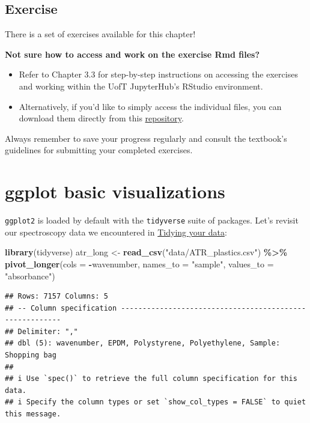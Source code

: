 \documentclass[
]{book}
\newenvironment{Shaded}{\begin{snugshade}}{\end{snugshade}}
\newcommand{\AttributeTok}[1]{\textcolor[rgb]{0.13,0.29,0.53}{#1}}
\newcommand{\FunctionTok}[1]{\textcolor[rgb]{0.13,0.29,0.53}{\textbf{#1}}}
\newcommand{\NormalTok}[1]{#1}
\newcommand{\OtherTok}[1]{\textcolor[rgb]{0.56,0.35,0.01}{#1}}
\newcommand{\SpecialCharTok}[1]{\textcolor[rgb]{0.81,0.36,0.00}{\textbf{#1}}}
\newcommand{\StringTok}[1]{\textcolor[rgb]{0.31,0.60,0.02}{#1}}
\begin{document}
\hypertarget{exercise-8}{%
\section{Exercise}\label{exercise-8}}

There is a set of exercises available for this chapter!

\textbf{Not sure how to access and work on the exercise Rmd files? }

\begin{itemize}
\item
  Refer to Chapter 3.3 for step-by-step instructions on accessing the exercises and working within the UofT JupyterHub's RStudio environment.
\item
  Alternatively, if you'd like to simply access the individual files, you can download them directly from this \href{https://github.com/UofTChem-Teaching/R4EnvChem-Exercises}{repository}.
\end{itemize}

Always remember to save your progress regularly and consult the textbook's guidelines for submitting your completed exercises.

\hypertarget{ggplot-basic-visualizations}{%
\chapter{ggplot basic visualizations}\label{ggplot-basic-visualizations}}

\texttt{ggplot2} is loaded by default with the \texttt{tidyverse} suite of packages. Let's revisit our spectroscopy data we encountered in \protect\hyperlink{tidying-your-data}{Tidying your data}:

\begin{Shaded}
\begin{Highlighting}[]
\FunctionTok{library}\NormalTok{(tidyverse)}
\NormalTok{atr\_long }\OtherTok{\textless{}{-}} \FunctionTok{read\_csv}\NormalTok{(}\StringTok{"data/ATR\_plastics.csv"}\NormalTok{) }\SpecialCharTok{\%\textgreater{}\%}
    \FunctionTok{pivot\_longer}\NormalTok{(}\AttributeTok{cols =} \SpecialCharTok{{-}}\NormalTok{wavenumber, }
               \AttributeTok{names\_to =} \StringTok{"sample"}\NormalTok{,}
               \AttributeTok{values\_to =} \StringTok{"absorbance"}\NormalTok{) }
\end{Highlighting}
\end{Shaded}

\begin{verbatim}
## Rows: 7157 Columns: 5
## -- Column specification --------------------------------------------------------
## Delimiter: ","
## dbl (5): wavenumber, EPDM, Polystyrene, Polyethylene, Sample: Shopping bag
## 
## i Use `spec()` to retrieve the full column specification for this data.
## i Specify the column types or set `show_col_types = FALSE` to quiet this message.
\end{verbatim}
\end{document}
